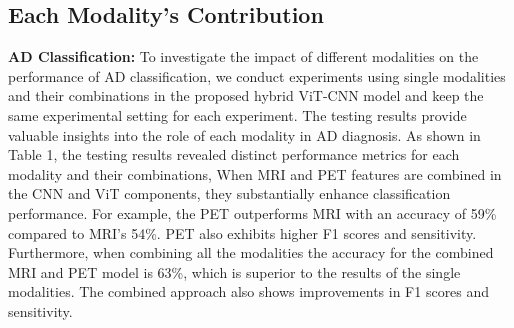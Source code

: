 
\subsection{Each Modality’s Contribution}
\textbf{AD Classification: } To investigate the impact of different modalities on the performance of AD classification, we conduct experiments using single modalities and their combinations in the proposed hybrid ViT-CNN model and keep the same experimental setting for each experiment. The testing results provide valuable insights into the role of each modality in AD diagnosis. As shown in Table 1, the testing results revealed distinct performance metrics for each modality and their combinations, When MRI and PET features are combined in the CNN and ViT components, they substantially enhance classification performance. For example, the PET outperforms MRI with an accuracy of 59\% compared to MRI’s 54\%. PET also exhibits higher F1 scores and sensitivity. Furthermore, when combining all the modalities the accuracy for the combined MRI and PET model is 63\%, which is superior to the results of the single modalities. The combined approach also shows improvements in F1 scores and sensitivity. 


